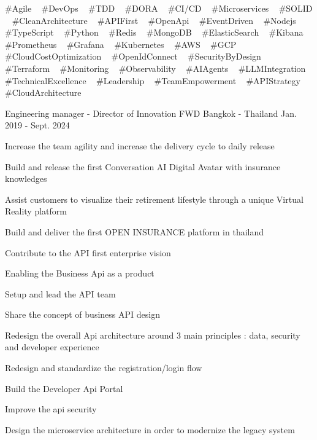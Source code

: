 \begin{cventries}
{\begin{cvitems}
      \end{cvitems}
    }
    {
      \#Agile ~
			\#DevOps ~
			\#TDD ~
			\#DORA ~
			\#CI/CD ~
			\#Microservices ~
			\#SOLID ~
			\#CleanArchitecture ~
			\#APIFirst ~
			\#OpenApi ~
			\#EventDriven ~
			\#Nodejs ~
			\#TypeScript ~
			\#Python ~
			\#Redis ~
			\#MongoDB ~
			\#ElasticSearch ~
			\#Kibana ~
			\#Prometheus ~
			\#Grafana ~
			\#Kubernetes ~
			\#AWS ~
			\#GCP ~
			\#CloudCostOptimization ~
			\#OpenIdConnect ~
			\#SecurityByDesign ~
			\#Terraform ~
			\#Monitoring ~
			\#Observability ~
			\#AIAgents ~
			\#LLMIntegration ~
			\#TechnicalExcellence ~
			\#Leadership ~
			\#TeamEmpowerment ~
			\#APIStrategy ~
			\#CloudArchitecture ~
    }


  \cventry
    {Engineering manager - Director of Innovation} %
    {FWD} %
    {Bangkok - Thailand} %
    {Jan. 2019 - Sept. 2024} %
    {
      \begin{cvitems} %
        \item {Increase the team agility and increase the delivery cycle to daily release}
        \item {Build and release the first Conversation AI Digital Avatar with insurance knowledges}
        \item {Assist customers to visualize their retirement lifestyle through a unique Virtual Reality platform}
        \item {Build and deliver the first OPEN INSURANCE platform in thailand}
        \item {Contribute to the API first enterprise vision}
        \item {Enabling the Business Api as a product}
        \item {Setup and lead the API team}
        \item {Share the concept of business API design}
        \item {Redesign the overall Api architecture around 3 main principles : data, security and developer experience}
        \item {Redesign and standardize the registration/login flow}
        \item {Build the Developer Api Portal}
        \item {Improve the api security}
        \item {Design the microservice architecture in order to modernize the legacy system}

\end{cvitems}}
\end{cventries}
